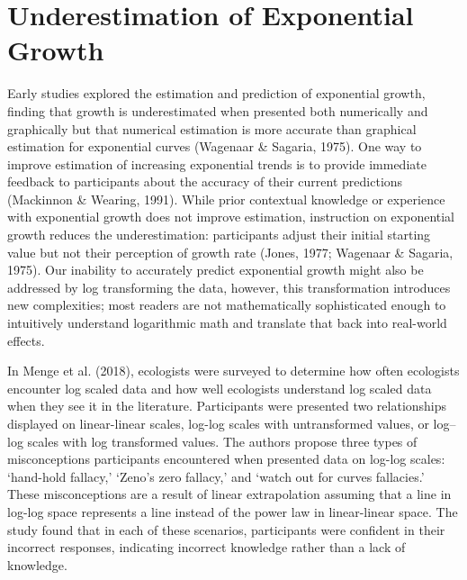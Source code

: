 \documentclass[print]{nuthesis}
\begin{document}
\hypertarget{underestimation}{%
\section{Underestimation of Exponential Growth}\label{underestimation}}


Early studies explored the estimation and prediction of exponential growth, finding that growth is underestimated when presented both numerically and graphically but that numerical estimation is more accurate than graphical estimation for exponential curves (Wagenaar \& Sagaria, 1975).
One way to improve estimation of increasing exponential trends is to provide immediate feedback to participants about the accuracy of their current predictions (Mackinnon \& Wearing, 1991).
While prior contextual knowledge or experience with exponential growth does not improve estimation, instruction on exponential growth reduces the underestimation: participants adjust their initial starting value but not their perception of growth rate (Jones, 1977; Wagenaar \& Sagaria, 1975).
Our inability to accurately predict exponential growth might also be addressed by log transforming the data, however, this transformation introduces new complexities; most readers are not mathematically sophisticated enough to intuitively understand logarithmic math and translate that back into real-world effects.

In Menge et al. (2018), ecologists were surveyed to determine how often ecologists encounter log scaled data and how well ecologists understand log scaled data when they see it in the literature.
Participants were presented two relationships displayed on linear-linear scales, log-log scales with untransformed values, or log--log scales with log transformed values.
The authors propose three types of misconceptions participants encountered when presented data on log-log scales: `hand-hold fallacy,' `Zeno's zero fallacy,' and `watch out for curves fallacies.'
These misconceptions are a result of linear extrapolation assuming that a line in log-log space represents a line instead of the power law in linear-linear space.
The study found that in each of these scenarios, participants were confident in their incorrect responses, indicating incorrect knowledge rather than a lack of knowledge.
\end{document}
